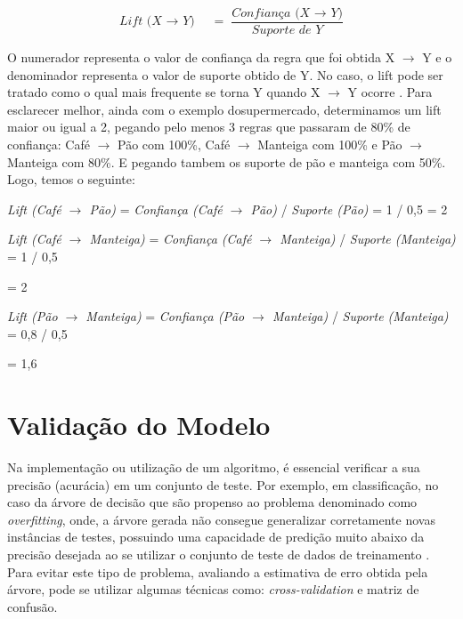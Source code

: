 \begin{equation}
    \label{eq:Lift}
        {\textit{Lift (X $\rightarrow$ Y)}\quad =\frac { \textit{Confiança (X $\rightarrow$ Y)} }{ \textit{Suporte de Y}} }
\end{equation}

\par
O numerador representa o valor de confiança da regra que foi obtida X $\rightarrow$ Y e o denominador representa o valor de suporte obtido de Y. No caso, o lift pode ser tratado como o qual mais frequente se torna Y quando X $\rightarrow$ Y ocorre \cite{Gonsalves2004}. Para esclarecer melhor, ainda com o exemplo dosupermercado, determinamos um lift maior ou igual a 2, pegando pelo menos 3 regras que passaram de 80\% de confiança: Café $\rightarrow$ Pão com 100\%, Café $\rightarrow$ Manteiga com 100\% e Pão $\rightarrow$ Manteiga com 80\%. E pegando tambem os suporte de pão e manteiga com 50\%. Logo, temos o seguinte:

\textit{Lift (Café $\rightarrow$ Pão)} = \textit{Confiança (Café $\rightarrow$ Pão)} /  \textit{Suporte (Pão)} = 1 / 0,5 = 2
    
\textit{Lift (Café $\rightarrow$ Manteiga)} = \textit{Confiança (Café $\rightarrow$ Manteiga)} /  \textit{Suporte (Manteiga)} = 1 / 0,5 

= 2
    
\textit{Lift (Pão $\rightarrow$ Manteiga)} = \textit{Confiança (Pão $\rightarrow$ Manteiga)} /  \textit{Suporte (Manteiga)} = 0,8 / 0,5 

= 1,6


\par
\textcolor{red}{}


\section{Validação do Modelo}

\par
Na implementação ou utilização de um algoritmo, é essencial verificar a sua precisão (acurácia) em um conjunto de teste. Por exemplo, em classificação, no caso da árvore de decisão que são propenso ao problema denominado como \textit{overfitting}, onde, a árvore gerada não consegue generalizar corretamente novas instâncias de testes, possuindo uma capacidade de predição muito abaixo da precisão desejada ao se utilizar o conjunto de teste de dados de treinamento \cite{Carvalho2014}. Para evitar este tipo de problema, avaliando a estimativa de erro obtida pela árvore, pode se utilizar algumas técnicas como: \textit{cross-validation} e matriz de confusão.



